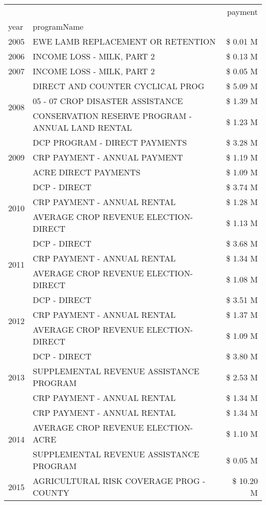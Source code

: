 \begin{tabular}{llr}
\toprule
 &  & payment \\
year & programName &  \\
\midrule
2005 & EWE LAMB REPLACEMENT OR RETENTION & \$ 0.01 M \\
\cline{1-3}
2006 & INCOME LOSS - MILK, PART 2 & \$ 0.13 M \\
\cline{1-3}
2007 & INCOME LOSS - MILK, PART 2 & \$ 0.05 M \\
\cline{1-3}
\multirow[t]{3}{*}{2008} & DIRECT AND COUNTER CYCLICAL PROG & \$ 5.09 M \\
 & 05 - 07 CROP DISASTER ASSISTANCE & \$ 1.39 M \\
 & CONSERVATION RESERVE PROGRAM - ANNUAL LAND RENTAL & \$ 1.23 M \\
\cline{1-3}
\multirow[t]{3}{*}{2009} & DCP PROGRAM - DIRECT PAYMENTS & \$ 3.28 M \\
 & CRP PAYMENT - ANNUAL PAYMENT & \$ 1.19 M \\
 & ACRE DIRECT PAYMENTS & \$ 1.09 M \\
\cline{1-3}
\multirow[t]{3}{*}{2010} & DCP - DIRECT & \$ 3.74 M \\
 & CRP PAYMENT - ANNUAL RENTAL & \$ 1.28 M \\
 & AVERAGE CROP REVENUE ELECTION-DIRECT & \$ 1.13 M \\
\cline{1-3}
\multirow[t]{3}{*}{2011} & DCP - DIRECT & \$ 3.68 M \\
 & CRP PAYMENT - ANNUAL RENTAL & \$ 1.34 M \\
 & AVERAGE CROP REVENUE ELECTION-DIRECT & \$ 1.08 M \\
\cline{1-3}
\multirow[t]{3}{*}{2012} & DCP - DIRECT & \$ 3.51 M \\
 & CRP PAYMENT - ANNUAL RENTAL & \$ 1.37 M \\
 & AVERAGE CROP REVENUE ELECTION-DIRECT & \$ 1.09 M \\
\cline{1-3}
\multirow[t]{3}{*}{2013} & DCP - DIRECT & \$ 3.80 M \\
 & SUPPLEMENTAL REVENUE ASSISTANCE PROGRAM & \$ 2.53 M \\
 & CRP PAYMENT - ANNUAL RENTAL & \$ 1.34 M \\
\cline{1-3}
\multirow[t]{3}{*}{2014} & CRP PAYMENT - ANNUAL RENTAL & \$ 1.34 M \\
 & AVERAGE CROP REVENUE ELECTION-ACRE & \$ 1.10 M \\
 & SUPPLEMENTAL REVENUE ASSISTANCE PROGRAM & \$ 0.05 M \\
\cline{1-3}
\multirow[t]{3}{*}{2015} & AGRICULTURAL RISK COVERAGE PROG - COUNTY & \$ 10.20 M \\

\end{tabular}
